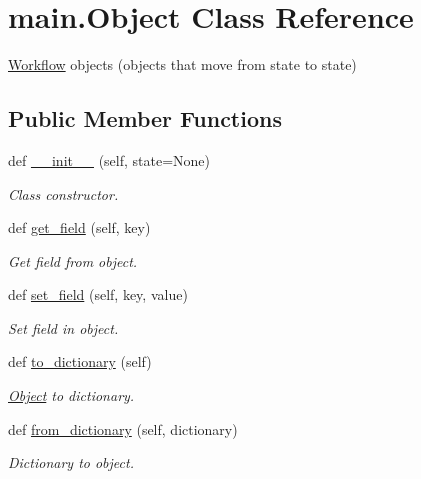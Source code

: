 \hypertarget{classmain_1_1_object}{}\section{main.\+Object Class Reference}
\label{classmain_1_1_object}


\hyperlink{classmain_1_1_workflow}{Workflow} objects (objects that move from state to state)  


\subsection*{Public Member Functions}
\begin{DoxyCompactItemize}
\item 
def \hyperlink{classmain_1_1_object_a85bb227ab4487467c3f59d2edf3ea0c4}{\+\_\+\+\_\+init\+\_\+\+\_\+} (self, state=None)
\begin{DoxyCompactList}\small\item\em Class constructor. \end{DoxyCompactList}\item 
def \hyperlink{classmain_1_1_object_aec683be0067d422e5e72e36d283a9369}{get\+\_\+field} (self, key)
\begin{DoxyCompactList}\small\item\em Get field from object. \end{DoxyCompactList}\item 
def \hyperlink{classmain_1_1_object_ad7651b7548fdeb58f033e68027a951ac}{set\+\_\+field} (self, key, value)
\begin{DoxyCompactList}\small\item\em Set field in object. \end{DoxyCompactList}\item 
def \hyperlink{classmain_1_1_object_a1fbd5ac71bf8b40bca1877c47aba6aa1}{to\+\_\+dictionary} (self)
\begin{DoxyCompactList}\small\item\em \hyperlink{classmain_1_1_object}{Object} to dictionary. \end{DoxyCompactList}\item 
def \hyperlink{classmain_1_1_object_af6e4dfd8b91828150a5f2d15ae441221}{from\+\_\+dictionary} (self, dictionary)
\begin{DoxyCompactList}\small\item\em Dictionary to object. \end{DoxyCompactList}\end{DoxyCompactItemize}


